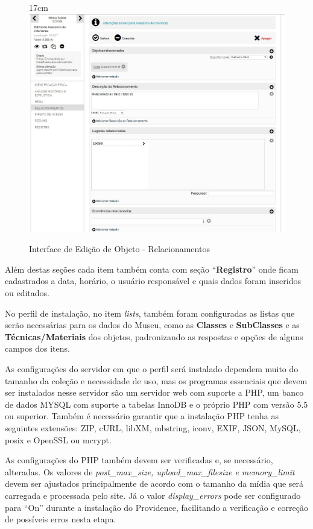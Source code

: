 \documentclass[a4paper,12pt,oneside,onecolumn,final,fleqn]{repUERJ}
\begin{document}
\begin{figure}[!ht]{17cm}
	\includegraphics[width=15cm, center]{figuras/Tela_Relac.jpg}
	\caption{Interface de Edição de Objeto - Relacionamentos} \label{fig:Tela_rel}
\end{figure}

Além destas seções cada item também conta com seção ``\textbf{Registro}'' onde ficam cadastrados a data, horário, o usuário responsável e quais dados foram inseridos ou editados.

No perfil de instalação, no item \textit{lists}, também foram configuradas as listas que serão necessárias para os dados do Museu, como as \textbf{Classes} e \textbf{SubClasses} e as \textbf{Técnicas/Materiais} dos objetos, padronizando as respostas e opções de alguns campos dos itens.

As configurações do servidor em que o perfil será instalado dependem muito do tamanho da coleção e necessidade de uso, mas os programas essenciais que devem ser instalados nesse servidor são um servidor web com suporte a PHP, um banco de dados MYSQL com suporte a tabelas InnoDB e o próprio PHP com versão 5.5 ou superior. Também é necessário garantir que a instalação PHP tenha as seguintes extensões: ZIP, cURL, libXM, mbstring, iconv, EXIF, JSON, MySQL, posix e OpenSSL ou mcrypt.

As configurações do PHP também devem ser verificadas e, se necessário, alteradas. Os valores de \textit{post\_max\_size, upload\_max\_filesize e memory\_limit} devem ser ajustados principalmente de acordo com o tamanho da mídia que será carregada e processada pelo site. Já o valor \textit{display\_errors} pode ser configurado para ``On'' durante a instalação do Providence, facilitando a verificação e correção de possíveis erros nesta etapa.
\end{document}
